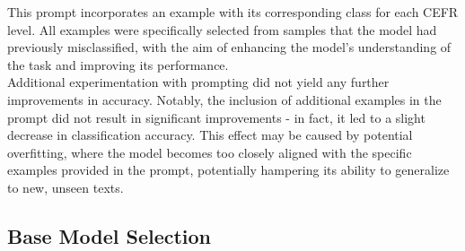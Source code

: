 This prompt incorporates an example with its corresponding class for each CEFR level. All examples were specifically selected from samples that the model had previously misclassified, with the aim of enhancing the model's understanding of the task and improving its performance. \\
Additional experimentation with prompting did not yield any further improvements in accuracy. Notably, the inclusion of additional examples in the prompt did not result in significant improvements - in fact, it led to a slight decrease in classification accuracy. This effect may be caused by potential overfitting, where the model becomes too closely aligned with the specific examples provided in the prompt, potentially hampering its ability to generalize to new, unseen texts. 

\subsection{Base Model Selection}
\label{ss:base_model_selection}
